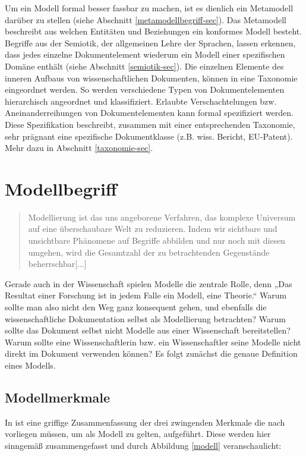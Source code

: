  
Um ein Modell formal besser fassbar zu machen, ist es dienlich ein Metamodell darüber zu stellen (siehe Abschnitt \ref{metamodellbegriff-sec}). Das Metamodell beschreibt aus welchen Entitäten und Beziehungen ein konformes Modell besteht. Begriffe aus der Semiotik, der allgemeinen Lehre der Sprachen, lassen erkennen, dass jedes einzelne Dokumentelement wiederum ein Modell einer spezifischen Domäne enthält (siehe Abschnitt \ref{semiotik-sec}). Die einzelnen Elemente des inneren Aufbaus von wissenschaftlichen Dokumenten, können in eine Taxonomie eingeordnet werden. So werden verschiedene Typen von Dokumentelementen hierarchisch angeordnet und klassifiziert. Erlaubte Verschachtelungen bzw. Aneinanderreihungen von Dokumentelementen kann formal spezifiziert werden. Diese Spezifikation beschreibt, zusammen mit einer entsprechenden Taxonomie, sehr prägnant eine spezifische Dokumentklasse (z.B. wiss. Bericht, EU-Patent). Mehr dazu in Abschnitt \ref{taxonomie-sec}.

 
\section{Modellbegriff}\label{modellbegriff-sec}
 
\begin{quote}
 Modellierung ist das uns angeborene Verfahren, das komplexe Universum auf eine überschaubare Welt zu reduzieren. Indem wir sichtbare und unsichtbare Phänomene auf Begriffe abbilden und nur noch mit diesen umgehen, wird die Gesamtzahl der zu betrachtenden Gegenstände beherrschbar[...] \citep[S.~7]{Ludewig}
\end{quote}
 
Gerade auch in der Wissenschaft spielen Modelle die zentrale Rolle, denn „Das Resultat einer Forschung ist in jedem Falle ein Modell, eine Theorie.“ \citep[S.~8]{Ludewig} Warum sollte man also nicht den Weg ganz konsequent gehen, und ebenfalls die wissenschaftliche Dokumentation selbst als Modellierung betrachten? Warum sollte das Dokument selbst nicht Modelle aus einer Wissenschaft bereitstellen? Warum sollte eine Wissenschaftlerin bzw. ein Wissenschaftler seine Modelle nicht direkt im Dokument verwenden können? Es folgt zunächst die genaue Definition eines Modells.

 
\subsection{Modellmerkmale}\label{modellmerkmale}
 
In \citep[S.~9]{Ludewig} ist eine griffige Zusammenfassung der drei zwingenden Merkmale die nach \citep{Stachowiak} vorliegen müssen, um als Modell zu gelten, aufgeführt. Diese werden hier sinngemäß zusammengefasst und durch Abbildung \ref{modell} veranschaulicht:

